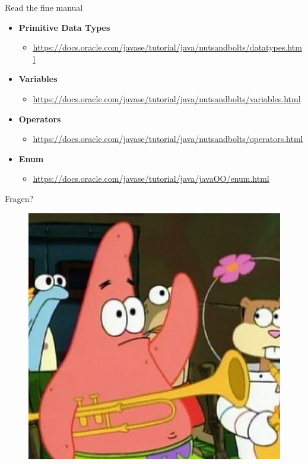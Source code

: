 \documentclass[18pt]{beamer}
\begin{document}
\begin{frame}{Read the fine manual}
    \begin{itemize}
        \item \textbf{Primitive Data Types}
        \begin{itemize}
            \item \url{https://docs.oracle.com/javase/tutorial/java/nutsandbolts/datatypes.html}
        \end{itemize}
        \item \textbf{Variables}
        \begin{itemize}
            \item \url{https://docs.oracle.com/javase/tutorial/java/nutsandbolts/variables.html}
        \end{itemize}
        \item \textbf{Operators}
        \begin{itemize}
            \item \url{https://docs.oracle.com/javase/tutorial/java/nutsandbolts/operators.html}
        \end{itemize}
        \item \textbf{Enum}
        \begin{itemize}
            \item \url{https://docs.oracle.com/javase/tutorial/java/javaOO/enum.html}
        \end{itemize}
    \end{itemize}
\end{frame}

\begin{frame}{Fragen?}
    \begin{figure}
        \includegraphics[scale=.3]{img/fragen.jpg}
    \end{figure}
\end{frame}
\end{document}
